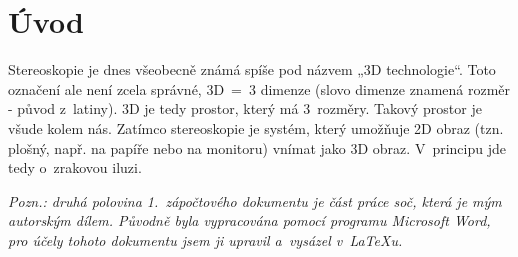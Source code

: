 \documentclass{article}
\begin{document}

\setlength{\parindent}{5ex}

\section*{Úvod}
Stereoskopie je dnes všeobecně známá spíše pod názvem „3D technologie“. Toto označení ale není zcela správné, 3D~=~3 dimenze (slovo dimenze znamená rozměr - původ z~latiny). 3D je tedy prostor, který má 3~rozměry. Takový prostor je všude kolem nás. Zatímco stereoskopie je systém, který umožňuje 2D obraz (tzn. plošný, např. na papíře nebo na monitoru) vnímat jako 3D obraz. V~principu jde tedy o~zrakovou iluzi.

\vspace{5mm} %
\noindent\makebox[\linewidth]{\rule{\paperwidth}{0.4pt}}

\textit{Pozn.: druhá polovina 1.~zápočtového dokumentu je část práce soč, která je mým autorským dílem. Původně byla vypracována pomocí programu Microsoft Word, pro účely tohoto dokumentu jsem ji upravil a~vysázel v~\LaTeX u.}
\end{document}
